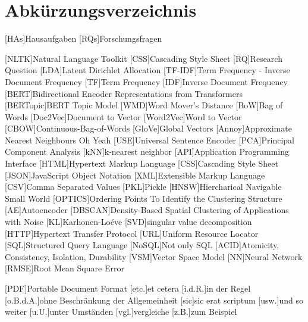\chapter*{Abkürzungsverzeichnis}


[HAs]{Hausaufgaben}
[RQs]{Forschungsfragen}

\begin{acronym}[XXXXXX]
    [NLTK]{Natural Language Toolkit}
    [CSS]{Cascading Style Sheet}
    [RQ]{Research Question}
    [LDA]{Latent Dirichlet Allocation}
    [TF-IDF]{Term Frequency - Inverse Document Frequency}
    [TF]{Term Frequency}
    [IDF]{Inverse Document Frequency}
    [BERT]{Bidirectional Encoder Representations from Transformers}
    [BERTopic]{BERT Topic Model}
    [WMD]{Word Mover's Distance}
    [BoW]{Bag of Words}
    [Doc2Vec]{Document to Vector}
    [Word2Vec]{Word to Vector}
    [CBOW]{Continuous-Bag-of-Words}
    [GloVe]{Global Vectors}
    [Annoy]{Approximate Nearest Neighbours Oh Yeah}
    [USE]{Universal Sentence Encoder}
    [PCA]{Principal Component Analysis}
    [kNN]{k-nearest neighbor}
    [API]{Application Programming Interface}
    [HTML]{Hypertext Markup Language}
    [CSS]{Cascading Style Sheet}
    [JSON]{JavaScript Object Notation}
    [XML]{Extensible Markup Language}
    [CSV]{Comma Separated Values}
    [PKL]{Pickle}
    [HNSW]{Hiercharical Navigable Small World}
    [OPTICS]{Ordering Points To Identify the Clustering Structure}
    [AE]{Autoencoder}
    [DBSCAN]{Density-Based Spatial Clustering of Applications with Noise}
    [KL]{Karhonen-Loéve}
    [SVD]{singular value decomposition}
    [HTTP]{Hypertext Transfer Protocol}
    [URL]{Uniform Resource Locator}
    [SQL]{Structured Query Language}
    [NoSQL]{Not only SQL}
    [ACID]{Atomicity, Consistency, Isolation, Durability}
    [VSM]{Vector Space Model}
    [NN]{Neural Network}
    [RMSE]{Root Mean Square Error}

    \vspace{\parskip}

    [PDF]{Portable Document Format}
    [etc.]{et cetera}
    [i.d.R.]{in der Regel}
    [o.B.d.A.]{ohne Beschränkung der Allgemeinheit}
    [sic]{sic erat scriptum}
    [usw.]{und so weiter}
    [u.U.]{unter Umständen}
    [vgl.]{vergleiche}
    [z.B.]{zum Beispiel}
\end{acronym}
